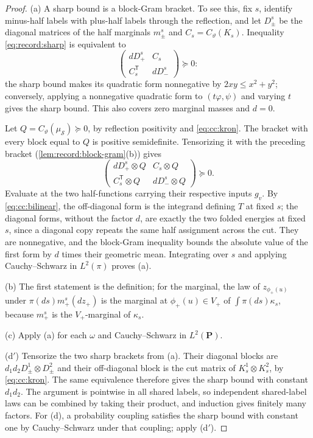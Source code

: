 \begin{proof}
(a) A sharp bound is a block-Gram bracket. To see this, fix $s$, identify
minus-half labels with plus-half labels through the reflection, and let
$D_\pm^s$ be the diagonal matrices of the half marginals $m_\pm^s$ and
$C_s=C_\vartheta(K_s)$. Inequality \eqref{eq:record:sharp} is equivalent to
\[
 \begin{pmatrix}dD_+^s&C_s\\C_s^{\mathsf T}&dD_-^s\end{pmatrix}\succeq0:
\]
the sharp bound makes its quadratic form nonnegative by $2xy\le x^2+y^2$;
conversely, applying a nonnegative quadratic form to $(t\varphi,\psi)$ and
varying $t$ gives the sharp bound. This also covers zero marginal masses
and $d=0$.

Let $Q=C_\vartheta(\mu_{\mathcal S})\succeq0$, by reflection positivity and
\eqref{eq:cc:kron}. The bracket with every block equal to $Q$ is positive
semidefinite. Tensorizing it with the preceding bracket
(\cref{lem:record:block-gram}(b)) gives
\[
 \begin{pmatrix}
 dD_+^s\otimes Q&C_s\otimes Q\\
 C_s^{\mathsf T}\otimes Q&dD_-^s\otimes Q
 \end{pmatrix}\succeq0.
\]
Evaluate at the two half-functions carrying their respective inputs $g_v$.
By \eqref{eq:cc:bilinear}, the off-diagonal form is the integrand defining
$T$ at fixed $s$; the diagonal forms, without the factor $d$, are exactly
the two folded energies at fixed $s$, since a diagonal copy repeats the
same half assignment across the cut. They are nonnegative, and the
block-Gram inequality bounds the absolute value of the first form by $d$
times their geometric mean. Integrating over $s$ and applying
Cauchy--Schwarz in $L^2(\pi)$ proves (a).

(b) The first statement is the definition; for the marginal, the law of
$z_{\phi_+(u)}$ under $\pi(ds)m_+^s(dz_+)$ is the marginal at
$\phi_+(u)\in V_+$ of $\int\pi(ds)\kappa_s$, because $m_+^s$ is the
$V_+$-marginal of $\kappa_s$.

(c) Apply (a) for each $\omega$ and Cauchy--Schwarz in $L^2(\mathbf P)$.

(d$'$) Tensorize the two sharp brackets from (a). Their diagonal blocks
are $d_1d_2D^1_\pm\otimes D^2_\pm$ and their off-diagonal block is the cut
matrix of $K_s^1\otimes K_s^2$, by \eqref{eq:cc:kron}. The same equivalence
therefore gives the sharp bound with constant $d_1d_2$. The argument is
pointwise in all shared labels, so independent shared-label laws can be
combined by taking their product, and induction gives finitely many factors.
For (d), a probability coupling satisfies the sharp bound with constant one
by Cauchy--Schwarz under that coupling; apply (d$'$).


\end{proof}
